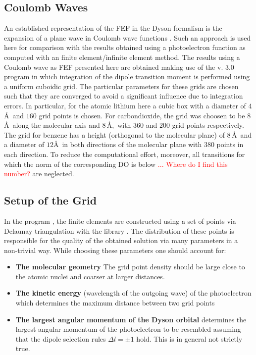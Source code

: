 \subsection{Coulomb Waves}
An established representation of the FEF in the Dyson formalism is the expansion of a plane wave in Coulomb wave functions \cite{ezDyson,do_modCoul,DO_TDDFT}.
Such an approach is used here for comparison with the results obtained using a photoelectron function as computed with an finite element/infinite element method.
The results using a Coulomb wave as FEF presented here are obtained making use of the  v. 3.0 \cite{ezDyson} program in which integration of the dipole transition moment  is performed using a uniform cuboidic grid.
The particular parameters for these grids are chosen such that they are converged to avoid a significant influence due to integration errors.
In particular, for the atomic lithium here a cubic box with a diameter of $4\,$\AA\, and $160$ grid points is chosen.
For carbondioxide, the grid was choosen to be $8\,$\AA\,  along the molecular axis and $8\,$\AA,\ with $360$ and $200$ grid points respectively.
The grid for benzene has a height (orthogonal to the molecular plane) of $8\,$\AA\, and a diameter of $12$\AA\, in both directions of the molecular plane with $380$ points in each direction.
To reduce the computational effort, moreover, all transitions for which the norm of the corresponding DO is below \textcolor{red}{$...$ Where do I find this number?} are neglected.

\subsection{Setup of the Grid}
\label{ch:GridSetup}
In the program , the finite elements are constructed using a set of points via Delaunay triangulation %
with the library  \cite{tetgen}.
The distribution of these points is responsible for the quality of the obtained solution via many parameters in a non-trivial way.
While choosing these parameters one should account for:
\begin{itemize}
   \item \textbf{The molecular geometry} The grid point density should be large close to the atomic nuclei and coarser at larger distances.
   \item \textbf{The kinetic energy} (wavelength of the outgoing wave) of the photoelectron which determines the maximum distance between two grid points
   \item \textbf{The largest angular momentum of the Dyson orbital} determines the largest angular momentum of the photoelectron to be resembled assuming that the dipole selection rules $\Delta l=\pm 1$ hold.
   This is in general not strictly true.
\end{itemize}

